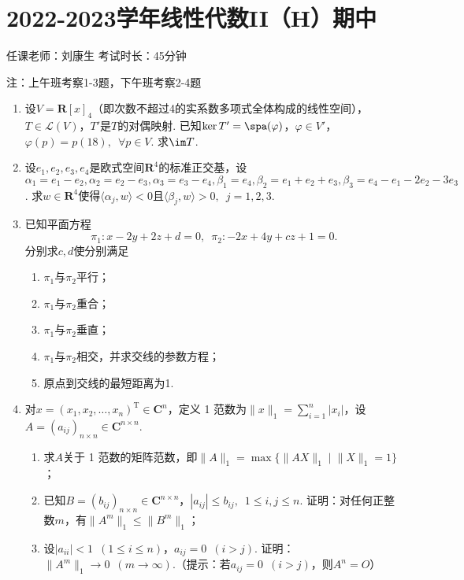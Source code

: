 \section{2022-2023学年线性代数II（H）期中}

\begin{center}
    任课老师：刘康生\hspace{4em} 考试时长：45分钟

    注：上午班考察1-3题，下午班考察2-4题
\end{center}

\begin{enumerate}
    \item 设$V=\mathbf{R}[x]_4$（即次数不超过4的实系数多项式全体构成的线性空间），$T\in\mathcal{L}(V)$，$T'$是$T$的对偶映射. 已知$\ker T'=\spa(\varphi)$，$\varphi\in V'$，$\varphi(p)=p(18),\enspace\forall p\in V$. 求$\im T$.

    \item 设$e_1,e_2,e_3,e_4$是欧式空间$\mathbf{R}^4$的标准正交基，设$\alpha_1=e_1-e_2,\alpha_2=e_2-e_3,\alpha_3=e_3-e_4,\beta_1=e_4,\beta_2=e_1+e_2+e_3,\beta_3=e_4-e_1-2e_2-3e_3$. 求$w\in\mathbf{R}^4$使得$\langle\alpha_j,w\rangle<0$且$\langle\beta_j,w\rangle>0,\enspace j=1,2,3$.

    \item 已知平面方程
    \[\pi_1\colon x-2y+2z+d=0,\enspace \pi_2\colon -2x+4y+cz+1=0.\]
    分别求$c,d$使分别满足
    \begin{enumerate}
        \item $\pi_1$与$\pi_2$平行；

        \item $\pi_1$与$\pi_2$重合；

        \item $\pi_1$与$\pi_2$垂直；

        \item $\pi_1$与$\pi_2$相交，并求交线的参数方程；

        \item 原点到交线的最短距离为1.
    \end{enumerate}

    \item 对$x=(x_1,x_2,\ldots,x_n)^\mathrm{T}\in\mathbf{C}^n$，定义 1 范数为$\lVert x \rVert_1=\sum\limits_{i=1}^n|x_i|$，设$A=(a_{ij})_{n\times n}\in\mathbf{C}^{n\times n}$.
    \begin{enumerate}
        \item 求$A$关于 1 范数的矩阵范数，即$\lVert A \rVert_1=\max\{\lVert AX \rVert_1\mid \lVert X \rVert_1=1\}$；

        \item 已知$B=(b_{ij})_{n\times n}\in\mathbf{C}^{n\times n}$，$|a_{ij}|\leqslant b_{ij},\enspace 1\leqslant i,j\leqslant n$. 证明：对任何正整数$m$，有$\lVert A^m \rVert_1\leqslant\lVert B^m \rVert_1$；

        \item 设$|a_{ii}|<1\enspace(1\leqslant i\leqslant n)$，$a_{ij}=0\enspace(i>j)$. 证明：$\lVert A^m \rVert_1\to 0\enspace(m\to\infty)$.（提示：若$a_{ij}=0\enspace(i>j)$，则$A^n=O$）
    \end{enumerate}
\end{enumerate}

\clearpage
